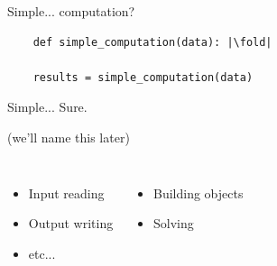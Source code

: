 \begin{frame}[fragile]{Simple... computation?}

    \vfill

    \begin{center}\begin{minipage}{0.7\linewidth}
    \begin{codewindow}
    \begin{verbatim}
    def simple_computation(data): |\fold|

    results = simple_computation(data)
    \end{verbatim}
    \end{codewindow}
    \end{minipage}\end{center}

    \pause

    \vfill

    \begin{center}
    Simple... Sure.

    \pause

    \vfill

     (we'll name this later)
    \end{center}

    \vfill

    \begin{columns}[T]

    \begin{itemize}
        \item Input reading
        \item Output writing
        \item etc...
    \end{itemize}


    \begin{itemize}
        \item Building objects
        \item Solving
    \end{itemize}
    \end{columns}

\end{frame}




